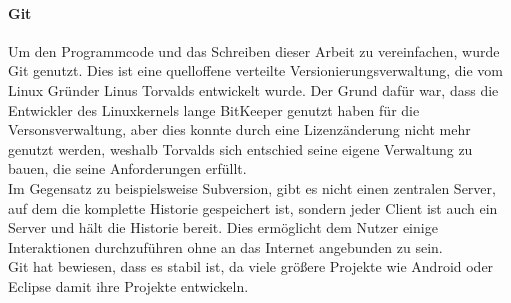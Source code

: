   \paragraph{Git}
  Um den Programmcode und das Schreiben dieser Arbeit zu vereinfachen, wurde Git genutzt. Dies ist
  eine quelloffene verteilte Versionierungsverwaltung, die vom Linux Gründer Linus Torvalds entwickelt
  wurde. Der Grund dafür war, dass die Entwickler des Linuxkernels lange BitKeeper genutzt haben
  für die Versonsverwaltung, aber dies konnte durch eine Lizenzänderung nicht mehr genutzt werden,
  weshalb Torvalds sich entschied seine eigene Verwaltung zu bauen, die seine Anforderungen erfüllt. \\
  Im Gegensatz zu beispielsweise Subversion, gibt es nicht einen zentralen Server, auf dem die komplette
  Historie gespeichert ist, sondern jeder Client ist auch ein Server und hält die Historie bereit. Dies
  ermöglicht dem Nutzer einige Interaktionen durchzuführen ohne an das Internet angebunden zu sein. \\
  Git hat bewiesen, dass es stabil ist, da viele größere Projekte wie Android oder Eclipse damit ihre
  Projekte entwickeln.
